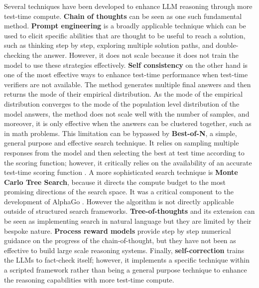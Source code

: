 Several techniques have been developed 
to enhance LLM reasoning through more test-time compute.
\textbf{Chain of thoughts} \citep{wei2022chain} 
can be seen as one such fundamental method. 
\textbf{Prompt engineering} is a broadly applicable technique \citep{white2023prompt}
 which can be used to elicit specific abilities 
that are thought to be useful to reach a solution, 
such as thinking step by step, 
exploring multiple solution paths, and double-checking the answer. 
However, it does not scale because it does not train the model to use these strategies effectively.
\textbf{Self consistency} \citep{wang2022self} on the other hand is one of the most
effective ways to enhance test-time performance when test-time verifiers 
are not available. 
The method generates multiple final answers 
and then returns the mode of their empirical distribution.
As the mode of the empirical distribution converges 
to the mode of the population level distribution of the model answers, 
the method does not scale well with the number of samples, 
and moreover, it is only effective when the answers
can be clustered together, such as in math problems.
This limitation can be bypassed by \textbf{Best-of-N}, a simple, general purpose and effective search technique.
It relies on sampling multiple responses from the model and then 
selecting the best at test time according to the scoring function; 
however, it critically relies on the availability of an accurate 
test-time scoring function \citep{gao2023scaling}.
A more sophisticated search technique is \textbf{Monte Carlo Tree Search}, because it directs the compute budget 
to the most promising directions of the search space.
It was a critical component to the development of AlphaGo \cite{silver2017mastering}.
However the algorithm is not directly applicable outside of structured search frameworks.
\textbf{Tree-of-thoughts} \citep{yao2024tree} and its extension \citep{gandhi2024stream, besta2024graph}
can be seen as implementing search in natural language but they are limited by their bespoke nature.
\textbf{Process reward models} 
\cite{lightman2024lets} provide step by step numerical guidance on the progress of the chain-of-thought, but they have not been as effective to build large scale reasoning systems.
Finally, \textbf{self-correction} 
\citep{kumar2024training}
trains the LLMs 
to fact-check itself; 
however, it implements a specific technique within a scripted framework
rather than being a general purpose technique to enhance 
the reasoning capabilities with more test-time compute.

